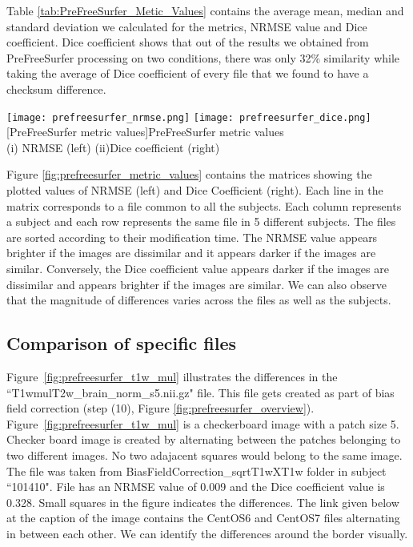 Table \ref{tab:PreFreeSurfer_Metic_Values} contains the average mean, median and standard deviation we calculated for the metrics, NRMSE value and Dice coefficient. Dice coefficient shows that out of the results we obtained from PreFreeSurfer processing on two conditions, there was only 32\% similarity while taking the average of Dice coefficient of every file that we found to have a checksum difference.

\begin{center}
\texttt{[image: prefreesurfer\_nrmse.png]}%
\texttt{[image: prefreesurfer\_dice.png]}
[PreFreeSurfer metric values]{PreFreeSurfer metric values\\(i) NRMSE (left) (ii)Dice coefficient (right)}
\label{fig:prefreesurfer_metric_values}
\end{center}

Figure \ref{fig:prefreesurfer_metric_values} contains the matrices showing the plotted values of NRMSE (left) and Dice Coefficient (right).
Each line in the matrix corresponds to a file common to all the subjects.
Each column represents a subject and each row represents the same file in 5 different subjects. The files are sorted according to their modification time.
The NRMSE value appears brighter if the images are dissimilar and it appears darker if the images are similar. Conversely, the Dice coefficient value appears darker if the images are dissimilar and appears brighter if the images are similar. We can also observe that the magnitude of differences varies across the files as well as the subjects.

\subsection{Comparison of specific files}
Figure~\ref{fig:prefreesurfer_t1w_mul} illustrates the differences in the ``T1wmulT2w\_brain\_norm\_s5.nii.gz" file. This file gets created as part of bias field correction (step (10), Figure \ref{fig:prefreesurfer_overview}). Figure~\ref{fig:prefreesurfer_t1w_mul} is a checkerboard image with a patch size 5. Checker board image is created by alternating between the patches belonging to two different images. No two adajacent squares would belong to the same image.
The file was taken from BiasFieldCorrection\_sqrtT1wXT1w folder in subject ``101410". File has an NRMSE value of 0.009 and the Dice coefficient value is 0.328. Small squares in the figure indicates the differences.
The link given below at the caption of the image contains the CentOS6 and CentOS7 files alternating in between each other. We can identify the differences around the border visually.

